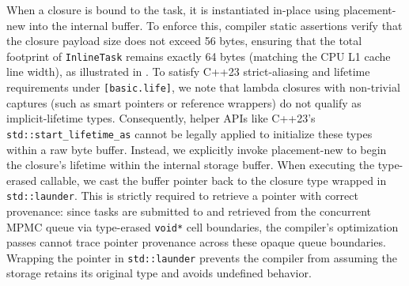 \documentclass[conference,10pt]{IEEEtran}
\begin{document}
When a closure is bound to the task, it is instantiated in-place using placement-new into the internal buffer. To enforce this, compiler static assertions verify that the closure payload size does not exceed 56 bytes, ensuring that the total footprint of \texttt{InlineTask} remains exactly 64 bytes (matching the CPU L1 cache line width), as illustrated in . To satisfy C++23 strict-aliasing and lifetime requirements under \texttt{[basic.life]}, we note that lambda closures with non-trivial captures (such as smart pointers or reference wrappers) do not qualify as implicit-lifetime types. Consequently, helper APIs like C++23's \texttt{std::start\_lifetime\_as} cannot be legally applied to initialize these types within a raw byte buffer. Instead, we explicitly invoke placement-new to begin the closure's lifetime within the internal storage buffer. When executing the type-erased callable, we cast the buffer pointer back to the closure type wrapped in \texttt{std::launder}. This is strictly required to retrieve a pointer with correct provenance: since tasks are submitted to and retrieved from the concurrent MPMC queue via type-erased \texttt{void*} cell boundaries, the compiler's optimization passes cannot trace pointer provenance across these opaque queue boundaries. Wrapping the pointer in \texttt{std::launder} prevents the compiler from assuming the storage retains its original type and avoids undefined behavior.
\end{document}
